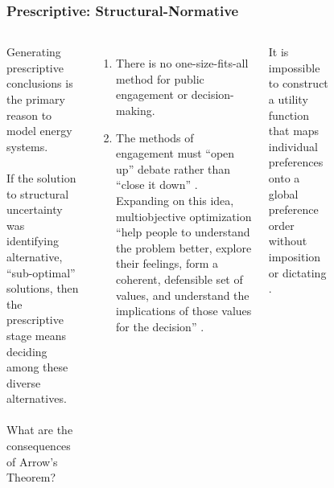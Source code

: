 \begin{frame}
    \frametitle{Prescriptive: Structural-Normative}
    \begin{columns}
        \column[t]{6cm}
        
        Generating prescriptive conclusions is the primary reason to model
        energy systems.\\~\\

        If the solution to structural uncertainty was identifying alternative,
        ``sub-optimal'' solutions, then the prescriptive stage means deciding
        among these diverse alternatives.\\~\\

        What are the consequences of Arrow's Theorem?
        \begin{enumerate}
            \item There is no one-size-fits-all method for public engagement or
            decision-making.
            \item The methods of engagement must ``open up'' debate rather than
            ``close it down'' \cite{wilsdon_see-through_2004}. Expanding on this
            idea, multiobjective optimization ``help people to understand the
            problem better, explore their feelings, form a coherent, defensible
            set of values, and understand the implications of those values for
            the decision'' \cite{hobbs_optimization_1995}. 
        \end{enumerate}

        \begin{theorem}
            It is impossible to construct a utility function that maps
            individual preferences onto a global preference order without
            imposition or dictating \cite{kasprzyk_many_2013,
            franssen_arrows_2005,arrow_difficulty_1950}.
        \end{theorem}

        \column[t]{4cm}
        \begin{figure}
            \centering
\end{figure}
\end{columns}
\end{frame}
